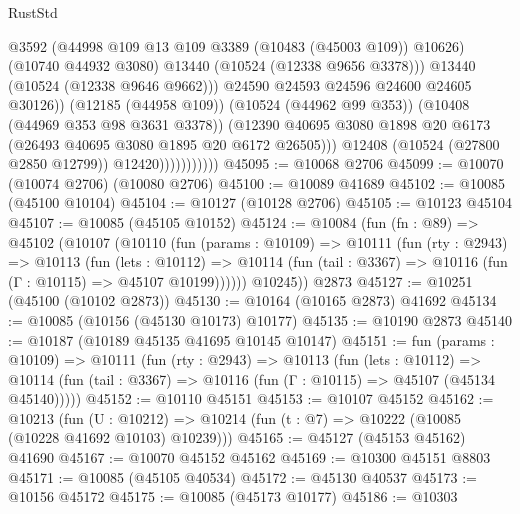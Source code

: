 \begin{lexlean}{RustStd}
\begin{coremodule}
                                    @3592
                                    (@44998 @109 @13 @109 @3389 (@10483 (@45003 @109)) @10626)
                                    (@10740 @44932 @3080)
                                    @13440
                                    (@10524 (@12338 @9656 @3378)))
                                  @13440
                                  (@10524 (@12338 @9646 @9662)))
                                @24590
                                @24593
                                @24596
                                @24600
                                @24605
                                @30126))
                            (@12185 (@44958 @109))
                            (@10524 (@44962 @99 @353))
                            (@10408 (@44969 @353 @98 @3631 @3378))
                            (@12390
                              @40695
                              @3080
                              @1898
                              @20
                              @6173
                              (@26493 @40695 @3080 @1895 @20 @6172 @26505)))
                          @12408
                          (@10524 (@27800 @2850 @12799))
                          @12420)))))))))))
@45095 := @10068 @2706
@45099 := @10070 (@10074 @2706) (@10080 @2706)
@45100 := @10089 @41689
@45102 := @10085 (@45100 @10104)
@45104 := @10127 (@10128 @2706)
@45105 := @10123 @45104
@45107 := @10085 (@45105 @10152)
@45124 := @10084
    (fun (fn : @89) =>
    @45102
      (@10107
        (@10110
          (fun (params : @10109) =>
          @10111
            (fun (rty : @2943) =>
            @10113
              (fun (lets : @10112) =>
              @10114 (fun (tail : @3367) => @10116 (fun (Γ : @10115) => @45107 @10199))))))
        @10245))
    @2873
@45127 := @10251 (@45100 (@10102 @2873))
@45130 := @10164 (@10165 @2873) @41692
@45134 := @10085 (@10156 (@45130 @10173) @10177)
@45135 := @10190 @2873
@45140 := @10187 (@10189 @45135 @41695 @10145 @10147)
@45151 := fun (params : @10109) =>
  @10111
    (fun (rty : @2943) =>
    @10113
      (fun (lets : @10112) =>
      @10114 (fun (tail : @3367) => @10116 (fun (Γ : @10115) => @45107 (@45134 @45140)))))
@45152 := @10110 @45151
@45153 := @10107 @45152
@45162 := @10213
    (fun (U : @10212) => @10214 (fun (t : @7) => @10222 (@10085 (@10228 @41692 @10103) @10239)))
@45165 := @45127 (@45153 @45162) @41690
@45167 := @10070 @45152 @45162
@45169 := @10300 @45151 @8803
@45171 := @10085 (@45105 @40534)
@45172 := @45130 @40537
@45173 := @10156 @45172
@45175 := @10085 (@45173 @10177)
@45186 := @10303

\end{coremodule}
\end{lexlean}
